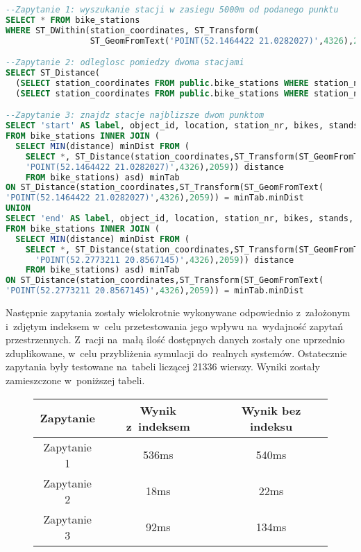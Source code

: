 \documentclass[11pt,a4paper]{article}
\begin{document}
\begin{lstlisting}[language=SQL,caption=Zapytania służące do testowania indeksu.]
--Zapytanie 1: wyszukanie stacji w zasiegu 5000m od podanego punktu
SELECT * FROM bike_stations
WHERE ST_DWithin(station_coordinates, ST_Transform(
                 ST_GeomFromText('POINT(52.1464422 21.0282027)',4326),2059), 5000);

--Zapytanie 2: odleglosc pomiedzy dwoma stacjami
SELECT ST_Distance(
  (SELECT station_coordinates FROM public.bike_stations WHERE station_nr = 6300),
  (SELECT station_coordinates FROM public.bike_stations WHERE station_nr = 6301))

--Zapytanie 3: znajdz stacje najblizsze dwom punktom
SELECT 'start' AS label, object_id, location, station_nr, bikes, stands, minDist
FROM bike_stations INNER JOIN (
  SELECT MIN(distance) minDist FROM (
    SELECT *, ST_Distance(station_coordinates,ST_Transform(ST_GeomFromText(
    'POINT(52.1464422 21.0282027)',4326),2059)) distance
    FROM bike_stations) asd) minTab
ON ST_Distance(station_coordinates,ST_Transform(ST_GeomFromText(
'POINT(52.1464422 21.0282027)',4326),2059)) = minTab.minDist
UNION
SELECT 'end' AS label, object_id, location, station_nr, bikes, stands, minDist
FROM bike_stations INNER JOIN (
  SELECT MIN(distance) minDist FROM (
    SELECT *, ST_Distance(station_coordinates,ST_Transform(ST_GeomFromText(
      'POINT(52.2773211 20.8567145)',4326),2059)) distance
    FROM bike_stations) asd) minTab
ON ST_Distance(station_coordinates,ST_Transform(ST_GeomFromText(
'POINT(52.2773211 20.8567145)',4326),2059)) = minTab.minDist
\end{lstlisting}

Następnie zapytania zostały wielokrotnie wykonywane odpowiednio z~założonym i~zdjętym indeksem w~celu przetestowania jego wpływu na~wydajność zapytań przestrzennych. Z~racji na~małą ilość dostępnych danych zostały one uprzednio zduplikowane, w~celu przybliżenia symulacji do~realnych systemów. Ostatecznie zapytania były testowane na~tabeli liczącej 21336 wierszy. Wyniki zostały zamieszczone w~poniższej tabeli.

\begin{figure}[H]
\begin{tabular}{ | c | c | c | }
\hline \textbf{Zapytanie} & \textbf{Wynik z~indeksem} & \textbf{Wynik bez indeksu} \\ \hline
  Zapytanie 1 & 536ms & 540ms \\ \hline
  Zapytanie 2 & 18ms & 22ms \\ \hline
  Zapytanie 3 & 92ms & 134ms \\ \hline
\end{tabular}
\end{figure}
\end{document}
